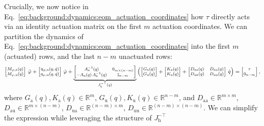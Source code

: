 Crucially, we now notice in Eq.~\ref{eq:background:dynamics:eom_actuation_coordinates} how $\tau$ directly acts via an identity actuation matrix on the first $m$ actuation coordinates.
%
We can partition the dynamics of Eq.~\ref{eq:background:dynamics:eom_actuation_coordinates} into the first $m$ (actuated) rows, and the last $n-m$ unactuated rows:
\begin{equation}\footnotesize
    \begin{bmatrix}
        M_{\varphi,\mathrm{a}}(q)\\ 
        M_{\varphi,\mathrm{u}}(q)
    \end{bmatrix} \, \ddot{\varphi} + \begin{bmatrix}
        \eta_{\varphi,\mathrm{a}}(q,\dot{q})\\ \eta_{\varphi,\mathrm{u}}(q,\dot{q})
    \end{bmatrix} \, \dot{\varphi} + \underbrace{\begin{bmatrix}
        A_\mathrm{a}^{-1}(q) & 0_{m \times (n-m)}\\
        -A_\mathrm{u}(q) \, A_\mathrm{a}^{-1}(q) & \mathbb{I}_{n-m}
    \end{bmatrix}}_{J_\mathrm{h}^{-\top}(q)} \left ( \begin{bmatrix}
        G_\mathrm{a}(q)\\ G_\mathrm{u}(q)
    \end{bmatrix} + \begin{bmatrix}
        K_\mathrm{a}(q)\\ K_\mathrm{u}(q)
    \end{bmatrix} + \begin{bmatrix}
        D_\mathrm{aa}(q) & D_\mathrm{au}(q)\\ 
        D_\mathrm{ua}(q) & D_\mathrm{uu}(q)
    \end{bmatrix} \, \dot{q} \right ) = \begin{bmatrix}
        \tau\\ 0_{n-m}
    \end{bmatrix},
\end{equation}
where $G_\mathrm{a}(q), K_\mathrm{a}(q) \in \mathbb{R}^{m}$, $G_\mathrm{u}(q), K_\mathrm{u}(q) \in \mathbb{R}^{n-m}$, and $D_\mathrm{aa} \in \mathbb{R}^{m \times m}$, $D_\mathrm{au} \in \mathbb{R}^{m \times (n-m)}$, $D_\mathrm{ua} \in \mathbb{R}^{(n-m) \times m}$, $D_\mathrm{uu} \in \mathbb{R}^{(n-m) \times (n-m)}$.
We can simplify the expression while leveraging the structure of $J_\mathrm{h}^{-\top}$
